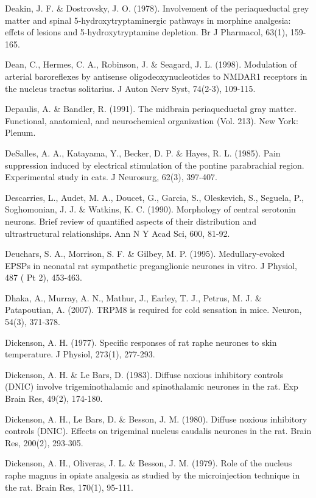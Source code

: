 \documentclass[a4paper,12pt,twoside]{report}
\begin{document}
\begin{singlespacing}
\begin{footnotesize}
Deakin, J. F. \& Dostrovsky, J. O. (1978). Involvement of the periaqueductal grey matter and spinal 5-hydroxy\linebreak tryptaminergic pathways in morphine analgesia: effcts of lesions and 5-hydroxytryptamine depletion. Br J Pharmacol, 63(1), 159-165.

Dean, C., Hermes, C. A., Robinson, J. \& Seagard, J. L. (1998). Modulation of arterial baroreflexes by antisense oligodeoxynucleotides to NMDAR1 receptors in the nucleus tractus solitarius. J Auton Nerv Syst, 74(2-3), 109-115.

Depaulis, A. \& Bandler, R. (1991). The midbrain periaqueductal gray matter. Functional, anatomical, and neurochemical organization (Vol. 213). New York: Plenum.

DeSalles, A. A., Katayama, Y., Becker, D. P. \& Hayes, R. L. (1985). Pain suppression induced by electrical stimulation of the pontine parabrachial region. Experimental study in cats. J Neurosurg, 62(3), 397-407.

Descarries, L., Audet, M. A., Doucet, G., Garcia, S., Oleskevich, S., Seguela, P., Soghomonian, J. J. \& Watkins, K. C. (1990). Morphology of central serotonin neurons. Brief review of quantified aspects of their distribution and ultrastructural relationships. Ann N Y Acad Sci, 600, 81-92.

Deuchars, S. A., Morrison, S. F. \& Gilbey, M. P. (1995). Medullary-evoked EPSPs in neonatal rat sympathetic preganglionic neurones in vitro. J Physiol, 487 ( Pt 2), 453-463.

Dhaka, A., Murray, A. N., Mathur, J., Earley, T. J., Petrus, M. J. \& Patapoutian, A. (2007). TRPM8 is required for cold sensation in mice. Neuron, 54(3), 371-378.

Dickenson, A. H. (1977). Specific responses of rat raphe neurones to skin temperature. J Physiol, 273(1), 277-293.

Dickenson, A. H. \& Le Bars, D. (1983). Diffuse noxious inhibitory controls (DNIC) involve trigeminothalamic and spinothalamic neurones in the rat. Exp Brain Res, 49(2), 174-180.

Dickenson, A. H., Le Bars, D. \& Besson, J. M. (1980). Diffuse noxious inhibitory controls (DNIC). Effects on trigeminal nucleus caudalis neurones in the rat. Brain Res, 200(2), 293-305.

Dickenson, A. H., Oliveras, J. L. \& Besson, J. M. (1979). Role of the nucleus raphe magnus in opiate analgesia as studied by the microinjection technique in the rat. Brain Res, 170(1), 95-111.


\end{footnotesize}
\end{singlespacing}
\end{document}
